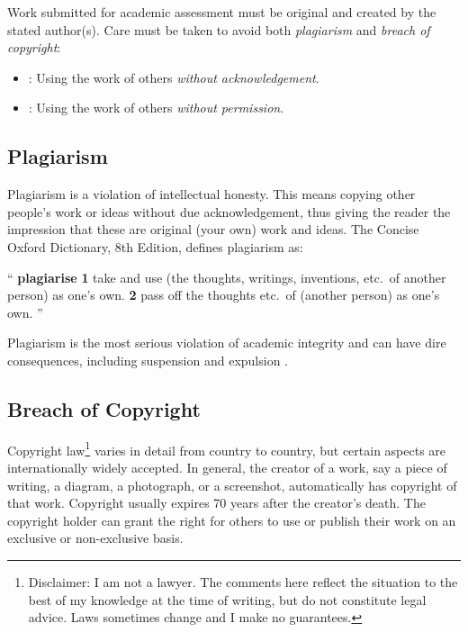 Work submitted for academic assessment must be original and created by
the stated author(s). Care must be taken to avoid both
\emph{plagiarism} and \emph{breach of copyright}:
\begin{itemize}
\item {}: Using the work of others \emph{without
  acknowledgement}.

\item {}: Using the work of others
  \emph{without permission}.
\end{itemize}





\subsection{Plagiarism}

Plagiarism is a violation of intellectual honesty. This means copying
other people's work or ideas without due acknowledgement, thus giving
the reader the impression that these are original (your own) work and
ideas. The Concise Oxford Dictionary, 8th Edition, defines plagiarism
as:
\begin{displayquote}
\enquote{
\textbf{plagiarise}
\textbf{1} take and use (the thoughts, writings, inventions, etc.\ of
another person) as one's own. \textbf{2} pass off the thoughts etc.\
of (another person) as one's own.
}
\end{displayquote}
Plagiarism is the most serious violation of academic integrity and can
have dire consequences, including suspension and expulsion
\parencite{Reisman2005}.



\subsection{Breach of Copyright}

Copyright law\footnote{Disclaimer: I am not a lawyer. The comments
  here reflect the situation to the best of my knowledge at the time
  of writing, but do not constitute legal advice. Laws sometimes
  change and I make no guarantees.} varies in detail from country to
country, but certain aspects are internationally widely accepted. In
general, the creator of a work, say a piece of writing, a diagram, a
photograph, or a screenshot, automatically has copyright of that
work. Copyright usually expires 70 years after the creator's
death. The copyright holder can grant the right for others to use or
publish their work on an exclusive or non-exclusive basis.

